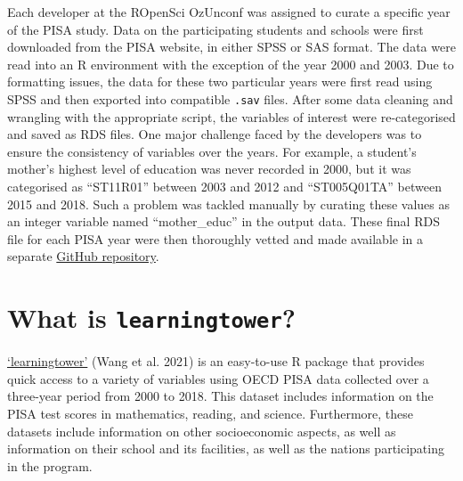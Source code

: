 Each developer at the ROpenSci OzUnconf was assigned to curate a specific year of the PISA study. Data on the participating students and schools were first downloaded from the PISA website, in either SPSS or SAS format. The data were read into an R environment with the exception of the year 2000 and 2003. Due to formatting issues, the data for these two particular years were first read using SPSS and then exported into compatible \texttt{.sav} files. After some data cleaning and wrangling with the appropriate script, the variables of interest were re-categorised and saved as RDS files. One major challenge faced by the developers was to ensure the consistency of variables over the years. For example, a student's mother's highest level of education was never recorded in 2000, but it was categorised as ``ST11R01'' between 2003 and 2012 and ``ST005Q01TA'' between 2015 and 2018. Such a problem was tackled manually by curating these values as an integer variable named ``mother\_educ'' in the output data. These final RDS file for each PISA year were then thoroughly vetted and made available in a separate \href{https://github.com/kevinwang09/learningtower_masonry}{GitHub repository}.

\hypertarget{what-is-learningtower}{%
\section{\texorpdfstring{What is \texttt{learningtower}?}{What is learningtower?}}\label{what-is-learningtower}}

\href{https://cran.r-project.org/web/packages/learningtower/index.html}{`learningtower'} (Wang et al. 2021) is an easy-to-use R package that provides quick access to a variety of variables using OECD PISA data collected over a three-year period from 2000 to 2018. This dataset includes information on the PISA test scores in mathematics, reading, and science. Furthermore, these datasets include information on other socioeconomic aspects, as well as information on their school and its facilities, as well as the nations participating in the program.

